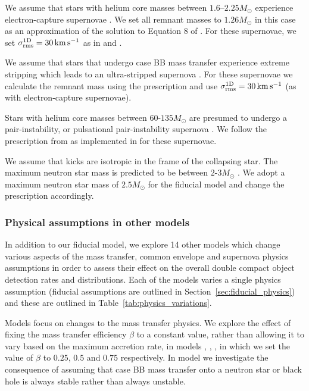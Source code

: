 We assume that stars with helium core masses between $1.6$--$2.25 \unit{M_{\odot}}$ \citep{Hurley+2002} experience electron-capture supernovae \citep{Nomoto+1984, Nomoto+1987, Ivanova+2008}. We set all remnant masses to $1.26 \unit{M_{\odot}}$ in this case as an approximation of the solution to Equation 8 of \citet{Timmes+1996}. For these supernovae, we set $\sigma_{\rm rms}^{\rm 1D} = 30 \unit{km}{s^{-1}}$ as in \citet{Pfahl+2002} and \citet{Podsiadlowski+2004}.

We assume that stars that undergo case BB mass transfer experience extreme stripping which leads to an ultra-stripped supernova \citep{Tauris+2013, Tauris+2015}. For these supernovae we calculate the remnant mass using the \citet{Fryer+2012} prescription and use $\sigma_{\rm rms}^{\rm 1D} = 30 \unit{km}{s^{-1}}$ (as with electron-capture supernovae).

Stars with helium core masses between $60$-$135 \unit{M_{\odot}}$ are presumed to undergo a pair-instability, or pulsational pair-instability supernova \citep[e.g.][]{Woosley+2007, Farmer+2019}. We follow the prescription from \citet{Marchant+2019} as implemented in \citep{Stevenson+2019} for these supernovae.

We assume that kicks are isotropic in the frame of the collapsing star. The maximum neutron star mass is predicted to be between $2$-$3 \unit{M_{\odot}}$ \citep[e.g.][]{Kalogera+1996, Fryer+2015, Margalit+2017}.
We adopt a maximum neutron star mass of $2.5 \unit{M_{\odot}}$ for the fiducial model and change the \citet{Fryer+2012} prescription accordingly.

\subsubsection{Physical assumptions in other models} \label{sec:variation_assumptions}
In addition to our fiducial model, we explore 14 other models which change various aspects of the mass transfer, common envelope and supernova physics assumptions in order to assess their effect on the overall double compact object detection rates and distributions. Each of the models varies a single physics assumption (fiducial assumptions are outlined in Section~\ref{sec:fiducial_physics}) and these are outlined in Table~\ref{tab:physics_variations}.

Models \modRangeMT{} focus on changes to the mass transfer physics. We explore the effect of fixing the mass transfer efficiency $\beta$ to a constant value, rather than allowing it to vary based on the maximum accretion rate, in models \modBetaLow{}, \modBetaMed{}, \modBetaHigh{}, in which we set the value of $\beta$ to $0.25$, $0.5$ and $0.75$ respectively. In model \modCaseBB{} we investigate the consequence of assuming that case BB mass transfer onto a neutron star or black hole is always stable rather than always unstable.

